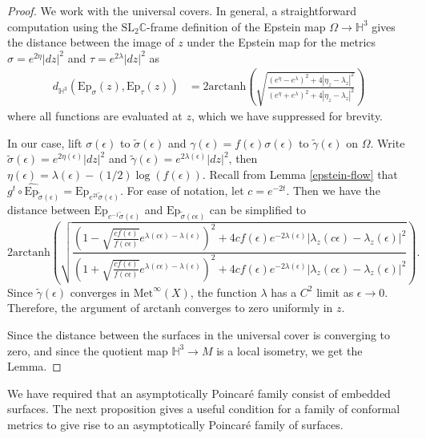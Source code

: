 \documentclass{amsart}
\newcommand{\C}{\mathbb{C}}
\renewcommand{\H}{\mathbb{H}}
\begin{document}
\begin{proof}
We work with the universal covers. 
In general, a straightforward computation using the $\mathrm{SL}_2\C$-frame definition of the Epstein  map $\Omega \to \H^3$ gives the distance between the image of $z$ under the Epstein map for the metrics $\sigma = e^{2\eta}|dz|^2$ and $\tau =e^{2\lambda}|dz|^2$ as
\begin{align*}
d_{\H^3} \left( \mathrm{Ep}_{\sigma}(z), \mathrm{Ep}_{\tau}(z) \right)
&= 2 \mathrm{arctanh} \left(\sqrt{ \frac{(e^\eta - e^{\lambda})^2  + 4|\eta_z - \lambda_z|^2}{(e^\eta + e^{\lambda})^2  + 4|\eta_z - \lambda_z|^2}} \right)
\end{align*}
where all functions are evaluated at $z$, which we have suppressed for brevity.

In our case, lift $\sigma(\epsilon)$ to $\tilde{\sigma}(\epsilon)$ and $\gamma(\epsilon) = f(\epsilon)\sigma(\epsilon)$ to $\tilde{\gamma}(\epsilon)$ on $\Omega$. 
Write $\tilde{\sigma}(\epsilon) = e^{2\eta(\epsilon)}|dz|^2$ and $\tilde{\gamma}(\epsilon) = e^{2\lambda(\epsilon)}|dz|^2$, then $\eta(\epsilon) = \lambda(\epsilon) - (1/2)\log(f(\epsilon))$. 
Recall from Lemma \ref{epstein-flow} that $g^t \circ \widehat{\mathrm{Ep}}_{\tilde{\sigma}(\epsilon)} = \mathrm{Ep}_{e^{2t}\tilde{\sigma}(\epsilon)}$.
For ease of notation, let $c = e^{-2t}$. 
Then we have the distance between $\mathrm{Ep}_{c^{-1} \tilde{\sigma}(\epsilon)}$ and $\mathrm{Ep}_{\tilde{\sigma}(c\epsilon)}$ can be simplified to
\[
2 \mathrm{arctanh} \left(\sqrt{ 
\frac
{(1 - \sqrt{\frac{c f(\epsilon)}{f(c \epsilon)}}e^{\lambda(c\epsilon) - \lambda(\epsilon)})^2 + 4 c f(\epsilon)e^{-2\lambda(\epsilon)}|\lambda_z(c\epsilon) - \lambda_z(\epsilon)|^2}
{(1 + \sqrt{\frac{c f(\epsilon)}{f(c \epsilon)}}e^{\lambda(c\epsilon) - \lambda(\epsilon)})^2 + 4 c f(\epsilon)e^{-2\lambda(\epsilon)}|\lambda_z(c\epsilon) - \lambda_z(\epsilon)|^2}
} \right).
\] 
Since $\tilde{\gamma}(\epsilon)$ converges in $\mathrm{Met}^\infty(X)$, the function $\lambda$ has a $C^2$ limit as $\epsilon \to 0$. 
Therefore, the argument of $\mathrm{arctanh}$ converges to zero uniformly in $z$.

Since the distance between the surfaces in the universal cover is converging to zero, and since the quotient map $\H^3 \to M$ is a local isometry, we get the Lemma. 
\end{proof}



We have required that an asymptotically Poincar\'e family consist of embedded surfaces.
The next proposition gives a useful condition for a family of conformal metrics to give rise to an asymptotically Poincar\'e family of surfaces. 
\end{document}
